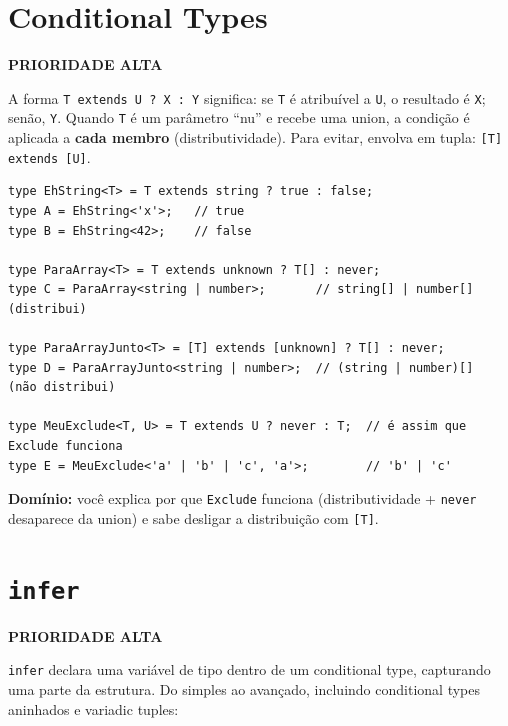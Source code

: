 \documentclass[12pt,a4paper,oneside]{book}
\newcommand{\alta}{\colorbox{red!15}{\sffamily\scriptsize\bfseries PRIORIDADE ALTA}}
\newcommand{\code}[1]{\texttt{#1}}
\newcommand{\dom}[1]{\begin{dominio}\textbf{Domínio:} #1\end{dominio}}
\begin{document}
\section{Conditional Types}
\label{sec:conditional}
\alta

A forma \code{T extends U ? X : Y} significa: se \code{T} é atribuível a \code{U}, o resultado é \code{X}; senão, \code{Y}. Quando \code{T} é um parâmetro ``nu'' e recebe uma union, a condição é aplicada a \textbf{cada membro} (distributividade). Para evitar, envolva em tupla: \code{[T] extends [U]}.

\begin{verbatim}
type EhString<T> = T extends string ? true : false;
type A = EhString<'x'>;   // true
type B = EhString<42>;    // false

type ParaArray<T> = T extends unknown ? T[] : never;
type C = ParaArray<string | number>;       // string[] | number[]  (distribui)

type ParaArrayJunto<T> = [T] extends [unknown] ? T[] : never;
type D = ParaArrayJunto<string | number>;  // (string | number)[]  (não distribui)

type MeuExclude<T, U> = T extends U ? never : T;  // é assim que Exclude funciona
type E = MeuExclude<'a' | 'b' | 'c', 'a'>;        // 'b' | 'c'
\end{verbatim}

\dom{você explica por que \code{Exclude} funciona (distributividade + \code{never} desaparece da union) e sabe desligar a distribuição com \code{[T]}.}

\section{\texttt{infer}}
\label{sec:infer}
\alta

\code{infer} declara uma variável de tipo dentro de um conditional type, capturando uma parte da estrutura. Do simples ao avançado, incluindo conditional types aninhados e variadic tuples:
\end{document}
